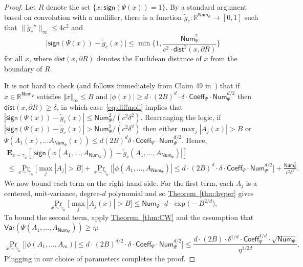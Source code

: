 \documentclass[11pt]{article}
\numberwithin{equation}{section}
\theoremstyle{definition}
\theoremstyle{plain}
\newcommand{\R}{\mathbb R}
\newcommand{\expref}[2]{\hyperref[#2]{#1~\ref{#2}}}
\newcommand{\Coeff}{\mathsf{Coeff}}
\newcommand{\Num}{\mathsf{Num}}
\begin{document}
\begin{proof}
Let $R$ denote the set $\{x: \mathsf{sign}(\Psi(x)) = 1\}$. By a standard argument based
on convolution with a mollifier, there is a function $\tilde{g}_c :
\R^{\mathsf{Num}_\Psi} \to [0, 1]$ such that $\| \tilde g_c''\|_\infty \le 4
c^2$ and
\begin{equation}\label{eq:diffmoli} 
    \big| \mathsf{sign}(\Psi(x)) - \tilde{g}_c(x) \big| \leq \min \bigg\{ 1,
    \frac{\mathsf{Num}_\Psi^2}{c^2 \cdot \mathsf{dist}^2(x, \partial R)}\bigg\}
\end{equation}
for all $x$, where $\mathsf{dist} (x, \partial R)$  denotes the Euclidean
distance of $x$ from the boundary of $R$.

It is not hard to check (and follows immediately from Claim 49 in~\cite{DS14})
that if $x \in \mathbb{R}^{\Num_\Psi} $ satisfies $\Vert x \Vert_{\infty} \le B$ and
$|\phi(x)| \ge d \cdot (2B)^{d} \cdot \delta \cdot \mathsf{Coeff}_\Psi \cdot \Num_\Psi^{d/2}$
then $\mathsf{dist}(x, \partial R)\ge \delta$, in which case~\eqref{eq:diffmoli} implies
that $|\mathsf{sign}(\Psi(x)) - \tilde g_c(x)| \le \mathsf{Num}_\Psi^2 / (c^2 \delta^2)$.
Rearranging the logic, if $|\mathsf{sign}(\Psi(x)) - \tilde g_c(x)| > \mathsf{Num}_\Psi^2 / (c^2 \delta^2)$ then either $\max_j |A_j(x)| > B$ or $\Psi(A_1(x), \dots A_{\mathsf{Num}_\Psi}(x)) \le d (2B)^d \delta \cdot \Coeff_\Psi \cdot \Num_\Psi^{d/2}$. Hence,
\begin{multline*}
    \mathbf{E}_{x \sim \gamma_n} [|\mathsf{sign}(\phi(A_1, \ldots, A_{\Num_\Psi})) -
    \tilde{g}_c(A_1, \ldots, A_{\Num_\Psi})|] \\
    \le
    \Pr_{x \sim \gamma_n} \big[\max_j |A_j| > B\big] + \Pr_{x \sim \gamma_n} \big[ |\phi(A_1, \ldots, A_{\Num_\Psi})| \le d \cdot (2B)^{d} \cdot \delta \cdot \Coeff_\Psi \cdot \Num_\Psi^{d/2}\big] + \frac{\Num_\Psi^2}{c^2 \delta^2}. 
\end{multline*}
We now bound each term on the right hand side. For the first term, each $A_j$
is a centered, unit-variance, degree-$d$ polynomial and so
\expref{Theorem}{thm:hyper} gives
$$
\Pr_{x \sim \gamma_n} \big[\max_j |A_j(x)| > B\big]  \le \Num_\Psi \cdot d \cdot \exp \big( -B^{2/d}\big).
$$
To bound the second term, apply \expref{Theorem}{thm:CW} and the assumption
that $\mathsf{Var}(\Psi(A_1, \ldots, A_{\Num_\Psi})) \ge \eta$:
\[
\Pr_{x \sim \gamma_n} \big[
    |\phi(A_1, \ldots, A_m)| \le d \cdot (2B)^{d/2} \cdot \delta \cdot \Coeff_\Psi \cdot \Num_\Psi^{d/2}\big] \le \frac{d \cdot (2B) \cdot \delta^{1/d} \cdot \Coeff_\Psi^{1/d} \cdot \sqrt{\Num_\Psi}}{\eta^{1/2d}}.
\]
Plugging in our choice of parameters completes the proof.
\end{proof}
\end{document}
